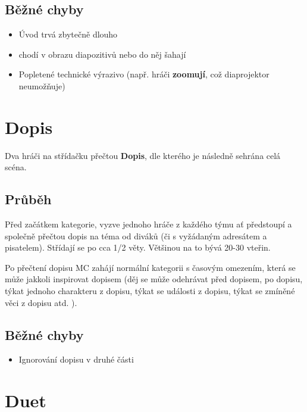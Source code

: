 \documentclass[main.tex]{subfiles}
\begin{document}
\subsection{ Běžné chyby } \begin{itemize}
\item Úvod trvá zbytečně dlouho
\item {} chodí v obrazu diapozitivů nebo do něj šahají
\item Popletené technické výrazivo (např. hráči \textbf{zoomují}{}, což diaprojektor neumožňuje)
\end{itemize}
 
 
 
 
 
\needspace{5cm} \section{Dopis} \label{dopis}  
Dva hráči na střídačku přečtou \textbf{Dopis}{}, dle kterého je následně sehrána celá scéna. 
\subsection{Průběh} Před začátkem kategorie, vyzve  jednoho hráče z každého týmu ať předstoupí a společně přečtou dopis na téma od diváků (či s vyžádaným adresátem a pisatelem). 
Střídají se po cca 1/2 věty.  Většinou na to bývá 20-30 vteřin.  
 
Po přečtení dopisu MC zahájí normální kategorii s časovým omezením, která se může jakkoli inspirovat dopisem (děj se může odehrávat před dopisem, po dopisu, týkat jednoho charakteru z dopisu, týkat se události z dopisu, týkat se zmíněné věci z dopisu atd. ). 
\subsection{Běžné chyby} \begin{itemize}
\item Ignorování dopisu v druhé části
\end{itemize}
 
 
 
 
\needspace{5cm} \section{Duet} \label{duet}  
 
\end{document}
